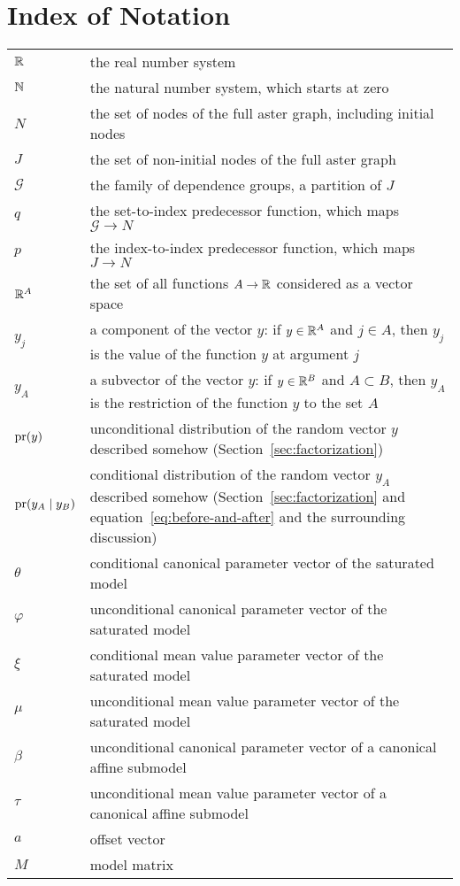 
\chapter*{Index of Notation}

\noindent
\begin{raggedright}
\noindent
\begin{longtable}{lp{4.4in}}
$\mathbb{R}$ & the real number system \\
$\mathbb{N}$ & the natural number system, which starts at zero \\
$N$ & the set of nodes of the full aster graph, including initial nodes \\
$J$ & the set of non-initial nodes of the full aster graph \\
$\mathcal{G}$ & the family of dependence groups, a partition of $J$ \\
$q$ & the set-to-index predecessor function, which maps $\mathcal{G} \to N$ \\
$p$ & the index-to-index predecessor function, which maps $J \to N$ \\
$\mathbb{R}^A$ & the set of all functions $A \to \mathbb{R}$ considered as
    a vector space \\
$y_j$ & a component of the vector $y$: if $y \in \mathbb{R}^A$ and $j \in A$,
    then $y_j$ is the value of the function $y$ at argument $j$ \\
$y_A$ & a subvector of the vector $y$: if $y \in \mathbb{R}^B$ and $A \subset B$,
    then $y_A$ is the restriction of the function $y$ to the set $A$ \\
$\operatorname{pr}(y)$ & unconditional distribution of the random vector $y$ described
    somehow (Section~\ref{sec:factorization}) \\
$\operatorname{pr}(y_A \mid y_B)$ & conditional distribution of the random vector $y_A$
    described somehow (Section~\ref{sec:factorization}
    and equation~\eqref{eq:before-and-after} and the surrounding discussion) \\
$\theta$ & conditional canonical parameter vector of the saturated model \\
$\varphi$ & unconditional canonical parameter vector of the saturated model \\
$\xi$ & conditional mean value parameter vector of the saturated model \\
$\mu$ & unconditional mean value parameter vector of the saturated model \\
$\beta$ & unconditional canonical parameter vector of a canonical
    affine submodel \\
$\tau$ & unconditional mean value parameter vector of a canonical
    affine submodel \\
$a$ & offset vector \\
$M$ & model matrix \\
\end{longtable}
\end{raggedright}
